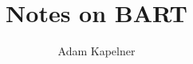 \documentclass[12pt]{article}
\title{Notes on BART}
\author{Adam Kapelner}
\begin{document}
\maketitle
\allowdisplaybreaks


%
%
%
%
%
%
%
%
%
%
%
\end{document}
